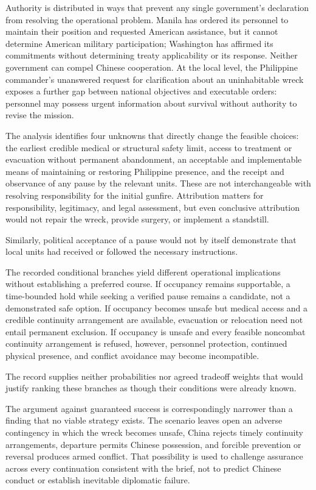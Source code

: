 \documentclass[11pt]{article}
\begin{document}
Authority is distributed in ways that prevent any single government’s declaration from resolving the operational problem. Manila has ordered its personnel to maintain their position and requested American assistance, but it cannot determine American military participation; Washington has affirmed its commitments without determining treaty applicability or its response. Neither government can compel Chinese cooperation. At the local level, the Philippine commander’s unanswered request for clarification about an uninhabitable wreck exposes a further gap between national objectives and executable orders: personnel may possess urgent information about survival without authority to revise the mission.

The analysis identifies four unknowns that directly change the feasible choices: the earliest credible medical or structural safety limit, access to treatment or evacuation without permanent abandonment, an acceptable and implementable means of maintaining or restoring Philippine presence, and the receipt and observance of any pause by the relevant units. These are not interchangeable with resolving responsibility for the initial gunfire. Attribution matters for responsibility, legitimacy, and legal assessment, but even conclusive attribution would not repair the wreck, provide surgery, or implement a standstill.

Similarly, political acceptance of a pause would not by itself demonstrate that local units had received or followed the necessary instructions.

The recorded conditional branches yield different operational implications without establishing a preferred course. If occupancy remains supportable, a time-bounded hold while seeking a verified pause remains a candidate, not a demonstrated safe option. If occupancy becomes unsafe but medical access and a credible continuity arrangement are available, evacuation or relocation need not entail permanent exclusion. If occupancy is unsafe and every feasible noncombat continuity arrangement is refused, however, personnel protection, continued physical presence, and conflict avoidance may become incompatible.

The record supplies neither probabilities nor agreed tradeoff weights that would justify ranking these branches as though their conditions were already known.

The argument against guaranteed success is correspondingly narrower than a finding that no viable strategy exists. The scenario leaves open an adverse contingency in which the wreck becomes unsafe, China rejects timely continuity arrangements, departure permits Chinese possession, and forcible prevention or reversal produces armed conflict. That possibility is used to challenge assurance across every continuation consistent with the brief, not to predict Chinese conduct or establish inevitable diplomatic failure.
\end{document}
